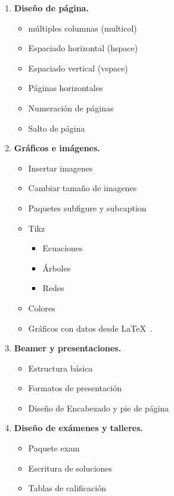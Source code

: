 \documentclass[11pt]{article}
\begin{document}
\begin{enumerate}
\begin{multicols}{2}
\begin{enumerate}[start=1,label={\bfseries \arabic*.},leftmargin=1cm]
\begin{itemize}
        \end{itemize}
    \item \textbf{Diseño de página.}
        \begin{itemize}
            \item múltiples columnas (multicol)
            \item Espaciado horizontal (hspace)
            \item Espaciado vertical (vspace)
            \item Páginas horizontales
            \item Numeración de páginas
            \item Salto de página
        \end{itemize}
    \item \textbf{Gráficos e imágenes.}
        \begin{itemize}
            \item Insertar imagenes
            \item Cambiar tamaño de imagenes
            \item Paquetes subfigure y subcaption
            \item Tikz
            \begin{itemize}
                \item Ecuaciones
                \item Árboles
                \item Redes
            \end{itemize}
            \item Colores
            \item Gráficos con datos desde \LaTeX\ .
        \end{itemize}
    \item \textbf{Beamer y presentaciones.}
        \begin{itemize}
            \item Estructura básica
            \item Formatos de presentación
            \item Diseño de Encabezado y pie de página
        \end{itemize}
    \item \textbf{Diseño de exámenes y talleres.}
        \begin{itemize}
            \item Paquete exam
            \item Escritura de soluciones
            \item Tablas de calificación

\end{itemize}
\end{enumerate}
\end{multicols}
\end{enumerate}
\end{document}
